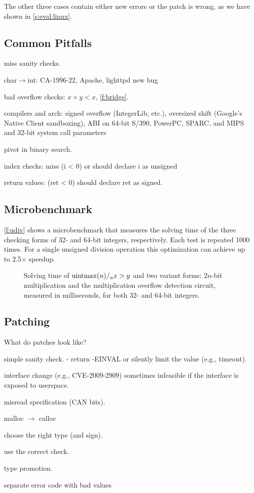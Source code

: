 The other three cases contain either new errors or the patch
is wrong, as we have shown in \autoref{s:eval:linux}.

\subsection{Common Pitfalls}
\label{s:eval:common}

miss sanity checks.

char$\to$int: 
CA-1996-22,
Apache,
lighttpd new bug

bad overflow checks: $x \times y < x$, 
\autoref{f:bridge}.

compilers and arch:
signed overflow (IntegerLib, etc.),
oversized shift (Google's Native Client sandboxing),
ABI on 64-bit S/390, PowerPC, SPARC, and MIPS
and 32-bit system call parameters~\cite[CVE-2009-0029]{cve}

pivot in binary search.

index checks:
miss (i < 0) or should declare i as unsigned

return values: (ret < 0)
should declare ret as signed.

\subsection{Microbenchmark}
\label{s:eval:micro}

\autoref{f:udiv} shows a microbenchmark that measures the solving
time of the three checking forms of 32- and 64-bit integers,
respectively.  Each test is repeated 1000 times.  For a single
unsigned division operation this optimization can achieve up to
2.5$\times$ speedup.

\begin{figure}
\centering

\caption{Solving time of $\operatorname{uintmax}(n) /_u x > y$ and two variant
forms: $2n$-bit multiplication and the multiplication overflow
detection circuit, measured in milliseconds, for both 32- and 64-bit
integers.}
\label{f:udiv}
\end{figure}

\subsection{Patching}

What do patches look like?

simple sanity check.
- return -EINVAL or silently limit the value (e.g., timeout).

interface change (e.g., CVE-2009-2909)
sometimes infeasible if the interface is exposed to userspace.

misread specification (CAN bits).

malloc $\to$ calloc

choose the right type (and sign).

use the correct check.

type promotion.

separate error code with bad values
